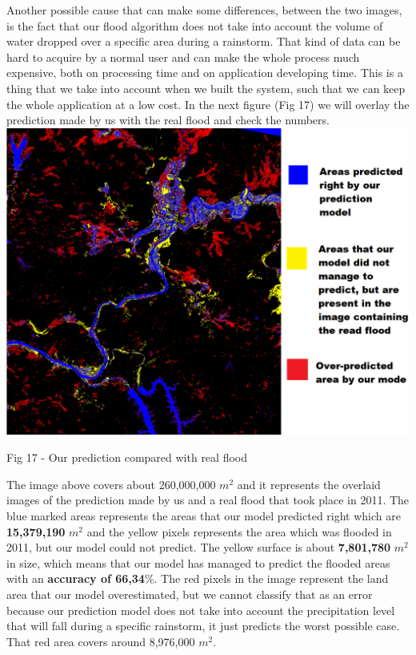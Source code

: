 \documentclass[12pt, a4paper]{report}
\begin{document}
Another possible cause that can make some differences, between the two images, is the fact that our flood algorithm does not take into account the volume of water dropped over a specific area during a rainstorm. That kind of data can be hard to acquire by a normal user and can make the whole process much expensive, both on processing time and on application developing time. This is a thing that we take into account when we built the system, such that we can keep the whole application at a low cost. In the next figure (Fig 17) we will overlay the prediction made by us with the real flood and check the numbers.
\medskip
\includegraphics[scale=0.6, center]{processed_flood_combined.png}
\begin{center}
Fig 17 - Our prediction compared with real flood 
\end{center}
\par 

The image above covers about 260,000,000 $m^2$ and it represents the overlaid images of the prediction made by us and a real flood that took place in 2011. The blue marked areas  represents the areas that our model predicted right which are \textbf{15,379,190} $m^2$ and the yellow pixels represents the area which was flooded in 2011, but our model could not predict. The yellow surface is about \textbf{7,801,780} $m^2$ in size, which means that our model has managed to predict the flooded areas with an \textbf{accuracy of 66,34}\%. The red pixels in the image represent the land area that our model overestimated, but we cannot classify that as an error because our prediction model does not take into account the precipitation level that will fall during a specific rainstorm, it just predicts the worst possible case. That red area covers around 8,976,000 $m^2$.
\end{document}
